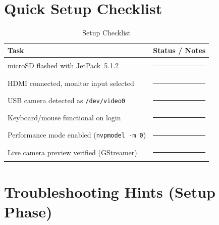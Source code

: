 \section{Quick Setup Checklist}

\begin{table}[H]
	\centering
	\caption{Setup Checklist}
	\begin{tabular}{|L{7.2cm}|L{6.0cm}|}
		\hline
		\textbf{Task} & \textbf{Status / Notes} \\ \hline
		microSD flashed with JetPack~5.1.2 & \rule{4cm}{0.4pt} \\ \hline
		HDMI connected, monitor input selected & \rule{4cm}{0.4pt} \\ \hline
		USB camera detected as \texttt{/dev/video0} & \rule{4cm}{0.4pt} \\ \hline
		Keyboard/mouse functional on login & \rule{4cm}{0.4pt} \\ \hline
		Performance mode enabled (\texttt{nvpmodel -m 0}) & \rule{4cm}{0.4pt} \\ \hline
		Live camera preview verified (GStreamer) & \rule{4cm}{0.4pt} \\ \hline
	\end{tabular}
\end{table}

\section{Troubleshooting Hints (Setup Phase)}

